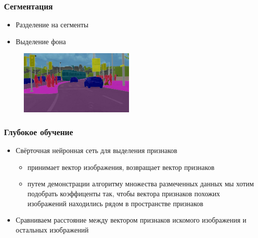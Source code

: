 \documentclass[xetex,mathserif,serif]{beamer}
\begin{document}
\begin{frame}
	\frametitle{Сегментация}

	\begin{itemize}
		\item Разделение на сегменты
		\item Выделение фона
	\end{itemize}


	\begin{figure}[h]
		\includegraphics[width=0.5\textwidth]{./images/segm.jpg}
		\centering
	\end{figure}
\end{frame}


\begin{frame}
	\frametitle{Глубокое обучение}

	\begin{itemize}
		\item Свёрточная нейронная сеть для выделения признаков
		      \begin{itemize}
			      \item принимает вектор изображения, возвращает вектор признаков
			      \item путем демонстрации алгоритму множества размеченных данных мы хотим подобрать коэффиценты так, чтобы вектора признаков похожих изображений находились рядом в пространстве признаков
		      \end{itemize}
		\item Сравниваем расстояние между вектором признаков искомого изображения и остальных изображений
	\end{itemize}
\end{frame}
\end{document}
